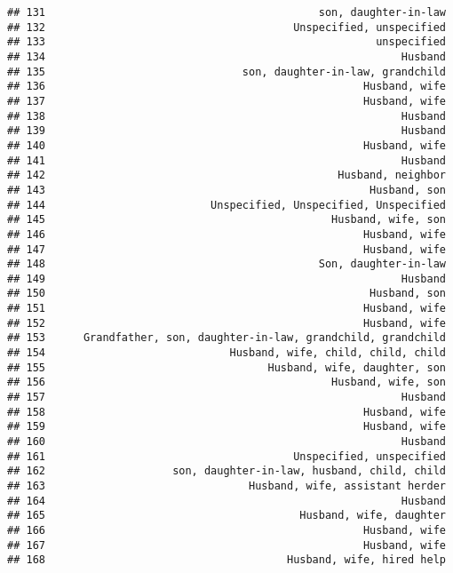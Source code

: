 \documentclass[
]{article}
\begin{document}
\begin{verbatim}
## 131                                           son, daughter-in-law
## 132                                       Unspecified, unspecified
## 133                                                    unspecified
## 134                                                        Husband
## 135                               son, daughter-in-law, grandchild
## 136                                                  Husband, wife
## 137                                                  Husband, wife
## 138                                                        Husband
## 139                                                        Husband
## 140                                                  Husband, wife
## 141                                                        Husband
## 142                                              Husband, neighbor
## 143                                                   Husband, son
## 144                          Unspecified, Unspecified, Unspecified
## 145                                             Husband, wife, son
## 146                                                  Husband, wife
## 147                                                  Husband, wife
## 148                                           Son, daughter-in-law
## 149                                                        Husband
## 150                                                   Husband, son
## 151                                                  Husband, wife
## 152                                                  Husband, wife
## 153      Grandfather, son, daughter-in-law, grandchild, grandchild
## 154                             Husband, wife, child, child, child
## 155                                   Husband, wife, daughter, son
## 156                                             Husband, wife, son
## 157                                                        Husband
## 158                                                  Husband, wife
## 159                                                  Husband, wife
## 160                                                        Husband
## 161                                       Unspecified, unspecified
## 162                    son, daughter-in-law, husband, child, child
## 163                                Husband, wife, assistant herder
## 164                                                        Husband
## 165                                        Husband, wife, daughter
## 166                                                  Husband, wife
## 167                                                  Husband, wife
## 168                                      Husband, wife, hired help

\end{verbatim}
\end{document}
